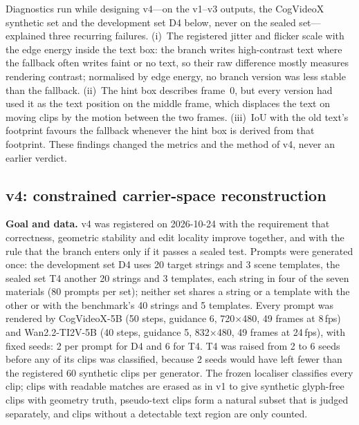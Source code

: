 Diagnostics run while designing v4---on the v1--v3 outputs, the CogVideoX synthetic set and the development set D4 below, never on the sealed set---explained three recurring failures. (i)~The registered jitter and flicker scale with the edge energy inside the text box: the branch writes high-contrast text where the fallback often writes faint or no text, so their raw difference mostly measures rendering contrast; normalised by edge energy, no branch version was less stable than the fallback. (ii)~The hint box describes frame~0, but every version had used it as the text position on the middle frame, which displaces the text on moving clips by the motion between the two frames. (iii)~IoU with the old text's footprint favours the fallback whenever the hint box is derived from that footprint. These findings changed the metrics and the method of v4, never an earlier verdict.

\subsection{v4: constrained carrier-space reconstruction}
\label{sec:supp_g_v4}
\textbf{Goal and data.} v4 was registered on 2026-10-24 with the requirement that correctness, geometric stability and edit locality improve together, and with the rule that the branch enters \method only if it passes a sealed test. Prompts were generated once: the development set D4 uses 20 target strings and 3 scene templates, the sealed set T4 another 20 strings and 3 templates, each string in four of the seven materials (80 prompts per set); neither set shares a string or a template with the other or with the benchmark's 40 strings and 5 templates. Every prompt was rendered by CogVideoX-5B (50 steps, guidance 6, 720$\times$480, 49 frames at 8\,fps) and Wan2.2-TI2V-5B (40 steps, guidance 5, 832$\times$480, 49 frames at 24\,fps), with fixed seeds: 2 per prompt for D4 and 6 for T4. T4 was raised from 2 to 6 seeds before any of its clips was classified, because 2 seeds would have left fewer than the registered 60 synthetic clips per generator. The frozen localiser classifies every clip; clips with readable matches are erased as in v1 to give synthetic glyph-free clips with geometry truth, pseudo-text clips form a natural subset that is judged separately, and clips without a detectable text region are only counted.

